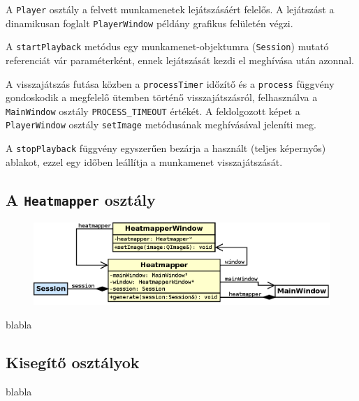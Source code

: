 A \texttt{Player} osztály a felvett munkamenetek lejátszásáért felelős. A lejátszást a dinamikusan foglalt \texttt{PlayerWindow} példány grafikus felületén végzi.

A \texttt{startPlayback} metódus egy munkamenet-objektumra (\texttt{Session}) mutató referenciát vár paraméterként, ennek lejátszását kezdi el meghívása után azonnal.

A visszajátszás futása közben a \texttt{processTimer} időzítő és a \texttt{process} függvény gondoskodik a megfelelő ütemben történő visszajátszásról, felhasználva a \texttt{MainWindow} osztály \texttt{PROCESS\_TIMEOUT} értékét. A feldolgozott képet a \texttt{PlayerWindow} osztály \texttt{setImage} metódusának meghívásával jeleníti meg.

A \texttt{stopPlayback} függvény egyszerűen bezárja a használt (teljes képernyős) ablakot, ezzel egy időben leállítja a munkamenet visszajátszását.

\subsection{A \texttt{Heatmapper} osztály}\label{sect:heatmapper}

\begin{figure}[!ht]
\centering
\includegraphics[width=140mm, keepaspectratio]{figures/class_heatmapper.png}
\end{figure}

blabla

\subsection{Kisegítő osztályok}\label{sect:helper}

blabla

